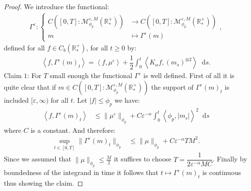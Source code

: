 \documentclass[11pt,a4paper]{article}
\newcommand{\RRP}{\mathbb{R}^+_*}
\newcommand{\MC}{\mathcal{M}}
\newcommand{\brac}[1]{\left\langle#1\right\rangle}
\newcommand{\dd}{\mathop{}\!\mathrm{d}}
\begin{document}
\begin{proof}
    We introduce the functional:
    \begin{align*}
    \Gamma^\varepsilon : 
    \left\lbrace 
    \begin{aligned}
        C\left([0,T]:\MC^{\varepsilon,M}_{\phi_p}(\RRP) \right) &\to C\left([0,T]:\MC^{\varepsilon,M}_{\phi_p}(\RRP) \right)\\
         m & \mapsto \Gamma^\varepsilon(m)
    \end{aligned}
    \right.,
    \end{align*}
    defined for all $f \in C_b(\RRP)$, for all $t \geq 0$ by:
    \begin{align*}
        \brac{f,\Gamma^\varepsilon(m)_t}= \brac{f,\mu^\varepsilon} + \dfrac12\int_0^t \brac{K_\alpha f,\left(m_s\right)^{\otimes 2}} \dd s.
    \end{align*}
    Claim $1$: For $T$ small enough the functional $\Gamma^\varepsilon$ is well defined. First of all it is quite clear that if $m \in C\left([0,T]:\MC^{\varepsilon,M}_{\phi_p}(\RRP) \right)$ the support of $\Gamma^\varepsilon(m)_t$ is included $[\varepsilon,\infty)$ for all $t$. Let $|f| \leq \phi_p$ we have:
    \begin{align*}
        \brac{f,\Gamma^\varepsilon(m)_t} &\leq \|\mu^\varepsilon\|_{\phi_p} + C\varepsilon^{-\alpha}\int_0^t \brac{\phi_p,|m_s|}^2 \dd s 
    \end{align*}
    where $C$ is a constant. And therefore:
    \begin{align*}
        \sup\limits_{t\in [0,T]} \| \Gamma^\varepsilon(m)_t\|_{\phi_p} 
        &\leq \|\mu\|_{\phi_p} + C\varepsilon^{-\alpha} T M^2.
    \end{align*}
    Since we assumed that $\|\mu\|_{\phi_p} \leq \frac{M}{2}$ it suffices to choose $T = \dfrac{1}{2\varepsilon^{-\alpha}MC}$. Finally by boundedness of the integrand in time it follows that $t \mapsto \Gamma^\varepsilon(m)_t$ is continuous thus showing the claim.


\end{proof}
\end{document}
